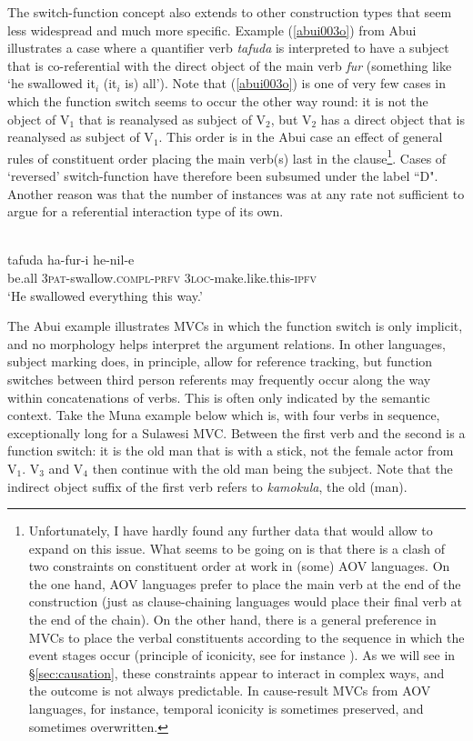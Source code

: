 The switch-function concept also extends to other construction types that seem less widespread and much more specific. Example (\ref{abui003o}) from Abui illustrates a case where a quantifier verb \textit{tafuda} is interpreted to have a subject that is co-referential with the direct object of the main verb \textit{fur} (something like `he swallowed it$_i$ (it$_i$ is) all'). Note that (\ref{abui003o}) is one of very few cases in which the function switch seems to occur the other way round: it is not the object of V$_1$ that is reanalysed as subject of V$_2$, but V$_2$ has a direct object that is reanalysed as subject of V$_1$. This order is in the Abui case an effect of general rules of constituent order placing the main verb(s) last in the clause\footnote{Unfortunately, I have hardly found any further data that would allow to expand on this issue. What seems to be going on is that there is a clash of two constraints on constituent order at work in (some) AOV languages. On the one hand, AOV languages prefer to place the main verb at the end of the construction (just as clause-chaining languages would place their final verb at the end of the chain). On the other hand, there is a general preference in MVCs to place the verbal constituents according to the sequence in which the event stages occur (principle of iconicity, see for instance \citealt{vanstaden2008serial}). As we will see in §\ref{sec:causation}, these constraints appear to interact in complex ways, and the outcome is not always predictable. In cause-result MVCs from AOV languages, for instance, temporal iconicity is sometimes preserved, and sometimes overwritten.}. Cases of `reversed' switch-function have therefore been subsumed under the label ``D". Another reason was that the number of instances was at any rate not sufficient to argue for a referential interaction type of its own.

\ea \label{abui003o}
\\
\gll tafuda ha-fur-i he-nil-e \\
be.all 3\textsc{pat}-swallow.\textsc{compl}-\textsc{prfv} 3\textsc{loc}-make.like.this-\textsc{ipfv} \\
\glft `He swallowed everything this way.’\\ 
\z

The Abui example illustrates MVCs in which the function switch is only implicit, and no morphology helps interpret the argument relations. In other languages, subject marking does, in principle, allow for reference tracking, but function switches between third person referents may frequently occur along the way within concatenations of verbs. This is often only indicated by the semantic context. Take the Muna example below which is, with four verbs in sequence, exceptionally long for a Sulawesi MVC. Between the first verb and the second is a function switch: it is the old man that is with a stick, not the female actor from V$_1$. V$_3$ and V$_4$ then continue with the old man being the subject. Note that the indirect object suffix of the first verb refers to \textit{kamokula}, the old (man).

